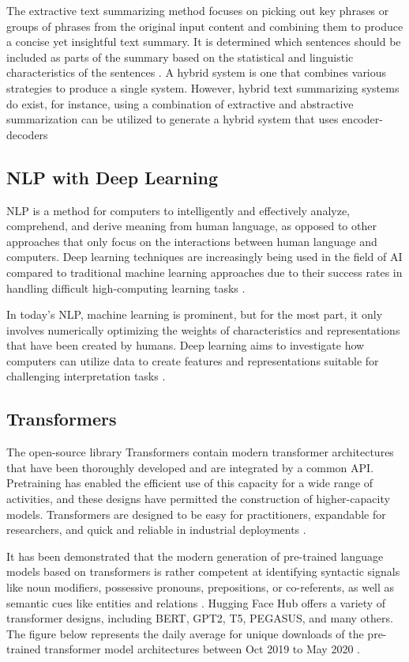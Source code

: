 \documentclass[conference]{IEEEtran}
\begin{document}
The extractive text summarizing method focuses on picking out key phrases or groups of phrases from the original input content and combining them to produce a concise yet insightful text summary. It is determined which sentences should be included as parts of the summary based on the statistical and linguistic characteristics of the sentences \cite{gupta_lehal_2010}. A hybrid system is one that combines various strategies to produce a single system. However, hybrid text summarizing systems do exist, for instance, using a combination of extractive and abstractive summarization can be utilized to generate a hybrid system that uses encoder-decoders \cite{kirmani_manzoor}

\subsection{NLP with Deep Learning}
NLP is a method for computers to intelligently and effectively analyze, comprehend, and derive meaning from human language, as opposed to other approaches that only focus on the interactions between human language and computers. Deep learning techniques are increasingly being used in the field of AI compared to traditional machine learning approaches due to their success rates in handling difficult high-computing learning tasks \cite{lopez_kalita_2017}.

In today's NLP, machine learning is prominent, but for the most part, it only involves numerically optimizing the weights of characteristics and representations that have been created by humans. Deep learning aims to investigate how computers can utilize data to create features and representations suitable for challenging interpretation tasks \cite{socher_bengio_manning}.

\subsection{Transformers}
The open-source library Transformers contain modern transformer architectures that have been thoroughly developed and are integrated by a common API. Pretraining has enabled the efficient use of this capacity for a wide range of activities, and these designs have permitted the construction of higher-capacity models. Transformers are designed to be easy for practitioners, expandable for researchers, and quick and reliable in industrial deployments \cite{wolf__2020}.

It has been demonstrated that the modern generation of pre-trained language models based on transformers is rather competent at identifying syntactic signals like noun modifiers, possessive pronouns, prepositions, or co-referents, as well as semantic cues like entities and relations \cite{brasoveanu_andonie_2020}. Hugging Face Hub offers a variety of transformer designs, including BERT, GPT2, T5, PEGASUS, and many others. The figure below represents the daily average for unique downloads of the pre-trained transformer model architectures between Oct 2019 to May 2020 \cite{wolf__2020}. 
\end{document}

